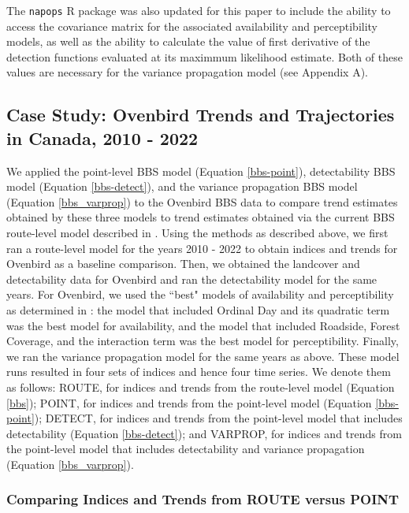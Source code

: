 \documentclass[12pt]{article}
\begin{document}
\par The \texttt{napops} R package was also updated for this paper to include the ability to access the covariance matrix for the associated availability and perceptibility models, as well as the ability to calculate the value of first derivative of the detection functions evaluated at its maximmum likelihood estimate.
Both of these values are necessary for the variance propagation model (see Appendix A).

\subsection{Case Study: Ovenbird Trends and Trajectories in Canada, 2010 - 2022}

\par We applied the point-level BBS model (Equation \ref{bbs-point}), detectability BBS model (Equation \ref{bbs-detect}), and the variance propagation BBS model (Equation \ref{bbs_varprop}) to the Ovenbird BBS data to compare trend estimates obtained by these three models to trend estimates obtained via the current BBS route-level model described in \citet{smith_spatially_2023}.
Using the methods as described above, we first ran a route-level model for the years 2010 - 2022 to obtain indices and trends for Ovenbird as a baseline comparison.
Then, we obtained the landcover and detectability data for Ovenbird and ran the detectability model for the same years.
For Ovenbird, we used the ``best" models of availability and perceptibility as determined in \citet{edwards_point_2023}: the model that included Ordinal Day and its quadratic term was the best model for availability, and the model that included Roadside, Forest Coverage, and the interaction term was the best model for perceptibility.
Finally, we ran the variance propagation model for the same years as above.
These model runs resulted in four sets of indices and hence four time series.
We denote them as follows: ROUTE, for indices and trends from the route-level model (Equation \ref{bbs}); POINT, for indices and trends from the point-level model (Equation \ref{bbs-point}); DETECT, for indices and trends from the point-level model that includes detectability (Equation \ref{bbs-detect}); and VARPROP, for indices and trends from the point-level model that includes detectability and variance propagation (Equation \ref{bbs_varprop}).

\subsubsection{Comparing Indices and Trends from ROUTE versus POINT}\label{route-vs-point}
\end{document}

